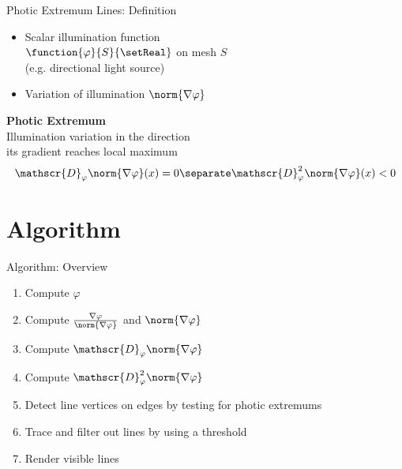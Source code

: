 \documentclass[aspectratio=169]{beamer}
\begin{document}
\begin{frame}{Photic Extremum Lines: Definition}
\begin{minipage}[c]{0.4\textwidth}
    \end{minipage}
    \hfill
    \begin{minipage}[c]{0.55\textwidth}
      \begin{itemize}
        \item<1-> Scalar illumination function \\
        $\function{\varphi}{S}{\setReal}$ on mesh $S$ \\
        (e.g. directional light source)
        \item<2-> Variation of illumination $\norm{\nabla\varphi}$
      \end{itemize}
      \bigskip
      \begin{mybox}
        \textbf{Photic Extremum}\\
        Illumination variation in the direction \\
        its gradient reaches local maximum
        \[
          \mathscr{D}_\varphi \norm{\nabla \varphi}(x) = 0
          \separate
          \mathscr{D}_\varphi^2 \norm{\nabla \varphi}(x) < 0
        \]
      \end{mybox}
    \end{minipage}
  \end{frame}

\section{Algorithm}
  \begin{frame}{Algorithm: Overview}
    \begin{mybox}
    \begin{enumerate}
      \item<+-> Compute $\varphi$
      \item<+-> Compute $\frac{\nabla\varphi}{\norm{\nabla\varphi}}$ and $\norm{\nabla\varphi}$
      \item<+-> Compute $\mathscr{D}_\varphi \norm{\nabla\varphi}$
      \item<+-> Compute $\mathscr{D}^2_\varphi \norm{\nabla\varphi}$
      \item<+-> Detect line vertices on edges by testing for photic extremums
      \item<+-> Trace and filter out lines by using a threshold
      \item<+-> Render visible lines
    \end{enumerate}
    \end{mybox}
  \end{frame}
\end{document}
